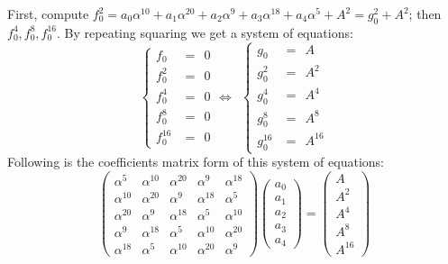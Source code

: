 \begin{Example}
First, compute $f_0^2= a_0\alpha^{10}+a_1\alpha^{20}+a_2\alpha^{9}+a_3\alpha^{18}+a_4\alpha^{5}+A^2 = g_0^2 + A^2$;
then $f_0^4, f_0^8, f_0^{16}$. By repeating squaring we get a system of equations:
\begin{displaymath}
  \begin{cases}
  f_0  &=\ \  0\\
  f_0^2 & =\ \  0\\
  f_0^4  &=\ \  0\\
  f_0^8  &=\ \  0\\
  f_0^{16} & =\ \ 0
  \end{cases}
\Longleftrightarrow\ \
\begin{cases}
  g_0 & =\ \  A\\
  g_0^2 & =\ \  A^2\\
  g_0^4 & =\ \  A^4\\
  g_0^8 & =\ \  A^8\\
  g_0^{16} & =\ \  A^{16}
  \end{cases}
\end{displaymath}
Following is the coefficients matrix form of this system of equations:
\begin{displaymath}
\begin{pmatrix}
\alpha^5 & \alpha^{10} & \alpha^{20} & \alpha^9 & \alpha^{18} \\
\alpha^{10} & \alpha^{20} & \alpha^9 & \alpha^{18} & \alpha^5 \\
\alpha^{20} & \alpha^9 & \alpha^{18} & \alpha^5 & \alpha^{10} \\
\alpha^9 & \alpha^{18} & \alpha^5 & \alpha^{10} & \alpha^{20} \\
\alpha^{18} & \alpha^5 & \alpha^{10} & \alpha^{20} & \alpha^9 
\end{pmatrix}
\begin{pmatrix}
a_0\\
a_1\\
a_2\\
a_3\\
a_4
\end{pmatrix}
=
\begin{pmatrix}
A\\
A^2\\
A^4\\
A^8\\
A^{16}
\end{pmatrix}
\end{displaymath}


\end{Example}
